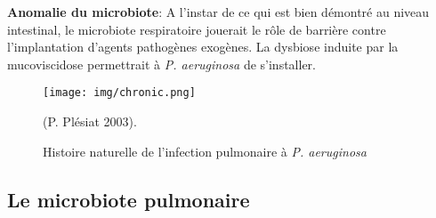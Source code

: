 \documentclass[12pt,a4paper]{article}
\begin{document}
\textbf{Anomalie du microbiote\cite{Keravec2015,Bernarde2015,HoMan2017,Nguyen2015}}:
A l'instar de ce qui est bien démontré au niveau intestinal, le microbiote respiratoire jouerait le rôle de barrière contre l'implantation d'agents pathogènes exogènes. La dysbiose induite par la mucoviscidose permettrait à \textit{P. aeruginosa} de s'installer.


\begin{figure}[ht]
\begin{center}
\texttt{[image: img/chronic.png]}\hfill
\end{center}
\caption{Histoire naturelle de l'infection pulmonaire à \textit{P. aeruginosa}}
\centering (P. Plésiat 2003\cite{Plesiat}).
\label{bach}
\end{figure}


\subsection{Le microbiote pulmonaire}
\end{document}
